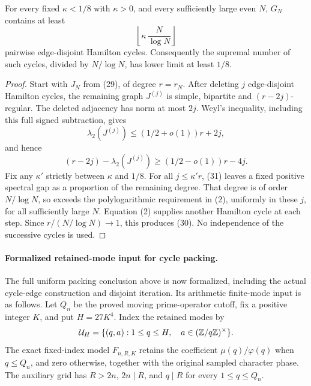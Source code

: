 \begin{theorem}
\label{thm:manycycles}
For every fixed \(\kappa<1/8\) with \(\kappa>0\), and every
sufficiently large even \(N\), \(G_N\) contains at least
\[
 \left\lfloor\kappa\,\frac N{\log N}\right\rfloor
 \tag{30}
\]
pairwise edge-disjoint Hamilton cycles.
Consequently the supremal number of such cycles, divided by
\(N/\log N\), has lower limit at least \(1/8\).
\end{theorem}
\begin{proof}
Start with \(J_N\) from (29), of degree \(r=r_N\).
After deleting \(j\) edge-disjoint Hamilton cycles, the remaining
graph \(J^{(j)}\) is simple, bipartite and \((r-2j)\)-regular.
The deleted adjacency has norm at most \(2j\). Weyl's inequality,
including this full signed subtraction, gives
\[
 \lambda_2(J^{(j)})\leq(1/2+o(1))r+2j,
\]
and hence
\[
 (r-2j)-\lambda_2(J^{(j)})
                   \geq(1/2-o(1))r-4j.                    \tag{31}
\]
Fix any \(\kappa'\) strictly between \(\kappa\) and \(1/8\).
For all \(j\leq\kappa'r\), (31) leaves a fixed positive
spectral gap as a proportion of the remaining degree.
That degree is of order \(N/\log N\), so exceeds the
polylogarithmic requirement in (2), uniformly in these \(j\),
for all sufficiently large \(N\).
Equation (2) supplies another Hamilton cycle at each step.
Since \(r/(N/\log N)\to1\), this produces (30).
No independence of the successive cycles is used.
\end{proof}

\paragraph{Formalized retained-mode input for cycle packing.}
The full uniform packing conclusion above is now formalized,
including the actual cycle-edge construction and disjoint iteration.
Its arithmetic finite-mode input is as follows.
Let \(Q_n\) be the proved moving prime-operator cutoff, fix a
positive integer \(K\), and put \(H=27K^4\). Index the retained
modes by
\[
 {\cal U}_H=\{(q,a):1\leq q\leq H,\quad
                          a\in(\mathbb Z/q\mathbb Z)^\times\}.
\]
The exact fixed-index model \(F_{n,R,K}\) retains the coefficient
\(\mu(q)/\varphi(q)\) when \(q\leq Q_n\), and zero otherwise,
together with the original sampled character phase. The
auxiliary grid has \(R>2n\), \(2n\mid R\), and \(q\mid R\)
for every \(1\leq q\leq Q_n\).

